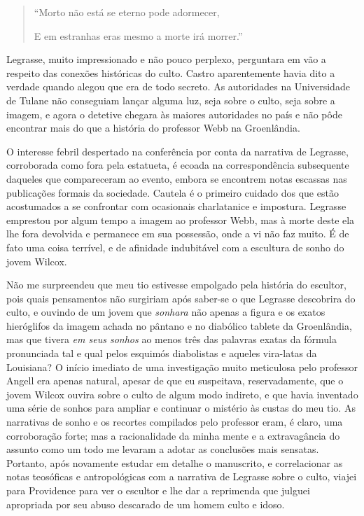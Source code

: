 \begin{quote}
\forceindent{}``Morto não está se eterno pode adormecer,

E em estranhas eras mesmo a morte irá morrer.''
\end{quote}

Legrasse, muito impressionado e não pouco perplexo, perguntara em vão a
respeito das conexões históricas do culto. Castro aparentemente havia
dito a verdade quando alegou que era de todo secreto. As autoridades na
Universidade de Tulane não conseguiam lançar alguma luz, seja sobre o
culto, seja sobre a imagem, e agora o detetive chegara às maiores
autoridades no país e não pôde encontrar mais do que a história do
professor Webb na Groenlândia.

O interesse febril despertado na conferência por conta da narrativa de
Legrasse, corroborada como fora pela estatueta, é ecoada na
correspondência subsequente daqueles que compareceram ao evento, embora
se encontrem notas escassas nas publicações formais da sociedade.
Cautela é o primeiro cuidado dos que estão acostumados a se confrontar
com ocasionais charlatanice e impostura. Legrasse emprestou por algum
tempo a imagem ao professor Webb, mas à morte deste ela lhe fora
devolvida e permanece em sua possessão, onde a vi não faz muito. É de
fato uma coisa terrível, e de afinidade indubitável com a escultura de
sonho do jovem Wilcox.

Não me surpreendeu que meu tio estivesse empolgado pela história do
escultor, pois quais pensamentos não surgiriam após saber-se o que
Legrasse descobrira do culto, e ouvindo de um jovem que \emph{sonhara}
não apenas a figura e os exatos hieróglifos da imagem achada no pântano
e no diabólico tablete da Groenlândia, mas que tivera \emph{em seus
sonhos} ao menos três das palavras exatas da fórmula pronunciada tal e
qual pelos esquimós diabolistas e aqueles vira-latas da Louisiana? O
início imediato de uma investigação muito meticulosa pelo professor
Angell era apenas natural, apesar de que eu suspeitava, reservadamente,
que o jovem Wilcox ouvira sobre o culto de algum modo indireto, e que
havia inventado uma série de sonhos para ampliar e continuar o mistério
às custas do meu tio. As narrativas de sonho e os recortes compilados
pelo professor eram, é claro, uma corroboração forte; mas a
racionalidade da minha mente e a extravagância do assunto como um todo
me levaram a adotar as conclusões mais sensatas. Portanto, após
novamente estudar em detalhe o manuscrito, e correlacionar as notas
teosóficas e antropológicas com a narrativa de Legrasse sobre o culto,
viajei para Providence para ver o escultor e lhe dar a reprimenda que
julguei apropriada por seu abuso descarado de um homem culto e idoso.

